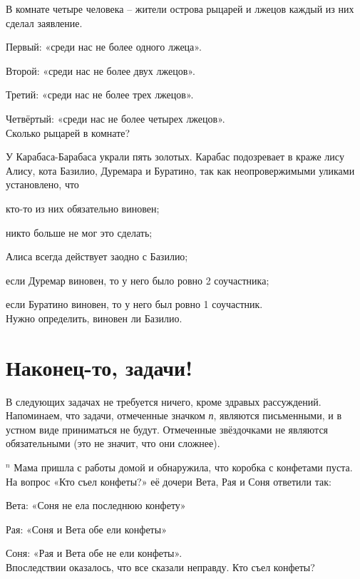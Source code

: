 \begin{ex}
    В комнате четыре человека – жители острова рыцарей и лжецов каждый из них сделал заявление.
    \par
    Первый: «среди нас не более одного лжеца».
    \par
    Второй: «среди нас не более двух лжецов».
    \par
    Третий: «среди нас не более трех лжецов».
    \par
    Четвёртый: «среди нас не более четырех лжецов».
    \\
    Сколько рыцарей в комнате?
\end{ex}

\begin{ex}
    У Карабаса-Барабаса украли пять золотых. Карабас подозревает в краже лису Алису, кота Базилио, Дуремара и Буратино, так как неопровержимыми уликами установлено, что 
    \par
    кто-то из них обязательно виновен; 
    \par
    никто больше не мог это сделать;
    \par
    Алиса всегда действует заодно с Базилио;
    \par
    если Дуремар виновен, то у него было ровно 2 соучастника;
    \par
    если Буратино виновен, то у него был ровно 1 соучастник.
    \\
    Нужно определить, виновен ли Базилио.
\end{ex}

\section{Наконец-то, задачи!}

В следующих задачах не требуется ничего, кроме здравых рассуждений. Напоминаем, что задачи, отмеченные значком \textit{п}, являются письменными, и в устном виде приниматься не будут. Отмеченные звёздочками не являются обязательными (это не значит, что они сложнее).

\begin{thm} $^n$
    Мама пришла с работы домой и обнаружила, что коробка с конфетами пуста. На вопрос «Кто съел конфеты?» её дочери Вета, Рая и Соня ответили так:
    \par
    Вета: «Соня не ела последнюю конфету» 
    \par
    Рая: «Соня и Вета обе ели конфеты»
    \par 
    Соня: «Рая и Вета обе не ели конфеты».
    \\ 
    Впоследствии оказалось, что все сказали неправду. Кто съел конфеты?
\end{thm}

